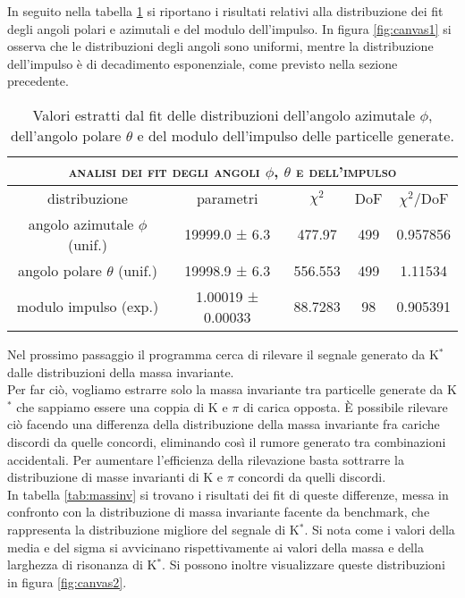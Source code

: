 In seguito nella tabella \ref{tab:ang_imp} si riportano i risultati relativi alla distribuzione dei fit degli angoli polari e azimutali e del modulo dell'impulso. In figura \ref{fig:canvas1} si osserva che le distribuzioni degli angoli sono uniformi, mentre la distribuzione dell'impulso è di decadimento esponenziale, come previsto nella sezione precedente.

\begin{table}[htp]
    \centering
    \begin{tabular}{||c|c|c|c|c||}
        \hline \hline
        \multicolumn{5}{||c||}{\textsc{analisi dei fit degli angoli $\phi$, $\theta$ e dell'impulso}} \\
        \hline \hline
        distribuzione & parametri & $\chi^2$ & DoF & $\chi^2/$DoF \\
        \hline
        angolo azimutale $\phi$ (unif.) & 19999.0 ± 6.3 & 477.97 & 499 & 0.957856\\
        angolo polare $\theta$ (unif.) & 19998.9 ± 6.3 & 556.553 & 499 & 1.11534\\
        modulo impulso (exp.) & 1.00019 ± 0.00033 & 88.7283 & 98 & 0.905391\\
        \hline \hline 
    \end{tabular}
    \caption[\small Distribuzione angoli e impulso]{\small Valori estratti dal fit delle distribuzioni dell'angolo azimutale $\phi$, dell'angolo polare $\theta$ e del modulo dell'impulso delle particelle generate.}
    \label{tab:ang_imp}
\end{table}

Nel prossimo passaggio il programma cerca di rilevare il segnale generato da K$^*$ dalle distribuzioni della massa invariante.\\
Per far ciò, vogliamo estrarre solo la massa invariante tra particelle generate da K$^*$ che sappiamo essere una coppia di K e $\pi$ di carica opposta. È possibile rilevare ciò facendo una differenza della distribuzione della massa invariante fra cariche discordi da quelle concordi, eliminando così il rumore generato tra combinazioni accidentali. Per aumentare l'efficienza della rilevazione basta sottrarre la distribuzione di masse invarianti di K e $\pi$ concordi da quelli discordi.\\
In tabella \ref{tab:massinv} si trovano i risultati dei fit di queste differenze, messa in confronto con la distribuzione di massa invariante facente da benchmark, che rappresenta la distribuzione migliore del segnale di K$^*$. Si nota come i valori della media e del sigma si avvicinano rispettivamente ai valori della massa e della larghezza di risonanza di K$^*$. Si possono inoltre visualizzare queste distribuzioni in figura \ref{fig:canvas2}.

